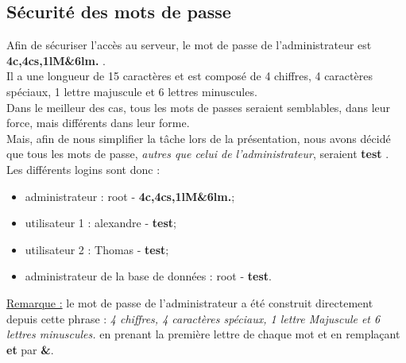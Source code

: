 \newpage
\subsection{Sécurité des mots de passe}
\label{subsec:securite-mdps}

Afin de sécuriser l'accès au serveur, le mot de passe de l'administrateur est
\og \textbf{4c,4cs,1lM\&6lm.} \fg. \\
Il a une longueur de 15 caractères et est composé de 4 chiffres, 4 caractères
spéciaux, 1 lettre majuscule et 6 lettres minuscules. \\

Dans le meilleur des cas, tous les mots de passes seraient semblables, dans leur
force, mais différents dans leur forme. \\
Mais, afin de nous simplifier la tâche lors de la présentation, nous avons
décidé que tous les mots de passe, \emph{autres que celui de l'administrateur},
seraient \og \textbf{test} \fg. \\

Les différents logins sont donc :
\begin{itemize}

    \item administrateur : root - \textbf{4c,4cs,1lM\&6lm.};
    \item utilisateur 1 : alexandre - \textbf{test};
    \item utilisateur 2 : Thomas - \textbf{test};
    \item administrateur de la base de données : root - \textbf{test}.

\end{itemize}

\underline{Remarque :} le mot de passe de l'administrateur a été construit
directement depuis cette phrase : \og \textit{4 chiffres, 4 caractères spéciaux,
1 lettre Majuscule et 6 lettres minuscules.} \fg en prenant la première lettre
de chaque mot et en remplaçant \textbf{et} par \textbf{\&}.

